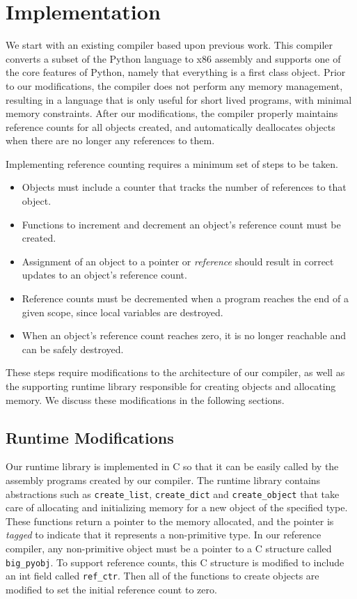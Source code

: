 \documentclass{sigplanconf}
\begin{document}
\section{Implementation}
\label{sec:implementation}

We start with an existing compiler based upon previous work\cite{siek}.  This compiler converts a subset of the Python language to x86 assembly and supports one of the core features of Python, namely that everything is a first class object.  Prior to our modifications, the compiler does not perform any memory management, resulting in a language that is only useful for short lived programs, with minimal memory constraints.  After our modifications, the compiler properly maintains reference counts for all objects created, and automatically deallocates objects when there are no longer any references to them.

Implementing reference counting requires a minimum set of steps to be taken.

\begin{itemize}
\item Objects must include a counter that tracks the number of references to that object.
\item Functions to increment and decrement an object's reference count must be created.
\item Assignment of an object to a pointer or \textit{reference} should result in correct updates to an object's reference count.
\item Reference counts must be decremented when a program reaches the end of a given scope, since local variables are destroyed.
\item When an object's reference count reaches zero, it is no longer reachable and can be safely destroyed.

\end{itemize}

These steps require modifications to the architecture of our compiler, as well as the supporting runtime library responsible for creating objects and allocating memory.  We discuss these modifications in the following sections.

\subsection{Runtime Modifications}
Our runtime library is implemented in C so that it can be easily called by the assembly programs created by our compiler.  The runtime library contains abstractions such as \texttt{create\_list}, \texttt{create\_dict} and \texttt{create\_object} that take care of allocating and initializing memory for a new object of the specified type.  These functions return a pointer to the memory allocated, and the pointer is \textit{tagged} to indicate that it represents a non-primitive type.  In our reference compiler, any non-primitive object must be a pointer to a C structure called \texttt{big\_pyobj}.  To support reference counts, this C structure is modified to include an int field called \texttt{ref\_ctr}.  Then all of the functions to create objects are modified to set the initial reference count to zero.
\end{document}
